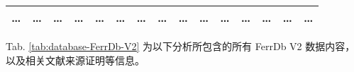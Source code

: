 \documentclass[
]{article}
\begin{document}
\begin{longtable}[]{@{}lllllllllllllll@{}}
\begin{minipage}[t]{0.05\columnwidth}
\ldots{}\strut
\end{minipage} & \begin{minipage}[t]{0.04\columnwidth}\raggedright
\ldots{}\strut
\end{minipage} & \begin{minipage}[t]{0.04\columnwidth}\raggedright
\ldots{}\strut
\end{minipage} & \begin{minipage}[t]{0.02\columnwidth}\raggedright
\ldots{}\strut
\end{minipage} & \begin{minipage}[t]{0.05\columnwidth}\raggedright
\ldots{}\strut
\end{minipage} & \begin{minipage}[t]{0.05\columnwidth}\raggedright
\ldots{}\strut
\end{minipage} & \begin{minipage}[t]{0.05\columnwidth}\raggedright
\ldots{}\strut
\end{minipage} & \begin{minipage}[t]{0.05\columnwidth}\raggedright
\ldots{}\strut
\end{minipage} & \begin{minipage}[t]{0.04\columnwidth}\raggedright
\ldots{}\strut
\end{minipage} & \begin{minipage}[t]{0.05\columnwidth}\raggedright
\ldots{}\strut
\end{minipage} & \begin{minipage}[t]{0.05\columnwidth}\raggedright
\ldots{}\strut
\end{minipage} & \begin{minipage}[t]{0.05\columnwidth}\raggedright
\ldots{}\strut
\end{minipage} & \begin{minipage}[t]{0.05\columnwidth}\raggedright
\ldots{}\strut
\end{minipage} & \begin{minipage}[t]{0.05\columnwidth}\raggedright
\ldots{}\strut
\end{minipage} & \begin{minipage}[t]{0.02\columnwidth}\raggedright
\ldots{}\strut
\end{minipage}\tabularnewline
\bottomrule
\end{longtable}

Tab. \ref{tab:database-FerrDb-V2} 为以下分析所包含的所有 FerrDb V2 数据内容，以及相关文献来源证明等信息。
\end{document}
